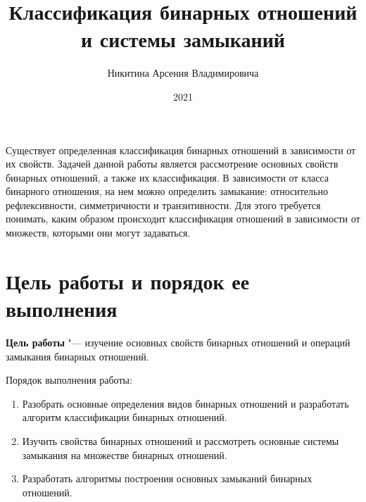 \documentclass[bachelor, och, labwork]{shiza}
\begin{document}

\title{Классификация бинарных отношений и системы замыканий}





\author{Никитина Арсения Владимировича}



\date{2021}

\maketitle


\tableofcontents

\intro

Существует определенная классификация бинарных отношений в зависимости от их 
свойств. Задачей данной работы является рассмотрение основных свойств бинарных 
отношений, а также их классификация. В зависимости от класса бинарного 
отношения, на нем можно определить замыкание: относительно рефлексивности,
симметричности и транзитивности. Для этого требуется понимать, каким образом 
происходит классификация отношений в зависимости от множеств, которыми они могут
задаваться.

\section{\textbf{Цель работы и порядок ее выполнения}}

\textbf{Цель работы} "--- изучение основных свойств бинарных отношений и 
операций замыкания бинарных отношений.

Порядок выполнения работы:

\begin{enumerate}

    \item Разобрать основные определения видов бинарных отношений и разработать
    алгоритм классификации бинарных отношений.

    \item Изучить свойства бинарных отношений и рассмотреть основные системы
    замыкания на множестве бинарных отношений.

    \item Разработать алгоритмы построения основных замыканий бинарных отношений.

\end{enumerate}
\end{document}
